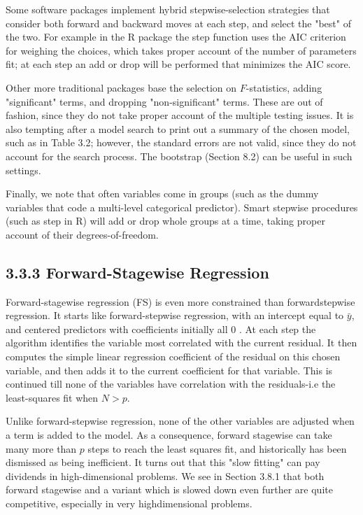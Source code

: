 \documentclass[10pt]{article}
\begin{document}
Some software packages implement hybrid stepwise-selection strategies that consider both forward and backward moves at each step, and select the "best" of the two. For example in the R package the step function uses the AIC criterion for weighing the choices, which takes proper account of the number of parameters fit; at each step an add or drop will be performed that minimizes the AIC score.

Other more traditional packages base the selection on $F$-statistics, adding "significant" terms, and dropping "non-significant" terms. These are out of fashion, since they do not take proper account of the multiple testing issues. It is also tempting after a model search to print out a summary of the chosen model, such as in Table 3.2; however, the standard errors are not valid, since they do not account for the search process. The bootstrap (Section 8.2) can be useful in such settings.

Finally, we note that often variables come in groups (such as the dummy variables that code a multi-level categorical predictor). Smart stepwise procedures (such as step in R) will add or drop whole groups at a time, taking proper account of their degrees-of-freedom.

\subsection*{3.3.3 Forward-Stagewise Regression}
Forward-stagewise regression (FS) is even more constrained than forwardstepwise regression. It starts like forward-stepwise regression, with an intercept equal to $\bar{y}$, and centered predictors with coefficients initially all 0 . At each step the algorithm identifies the variable most correlated with the current residual. It then computes the simple linear regression coefficient of the residual on this chosen variable, and then adds it to the current coefficient for that variable. This is continued till none of the variables have correlation with the residuals-i.e the least-squares fit when $N>p$.

Unlike forward-stepwise regression, none of the other variables are adjusted when a term is added to the model. As a consequence, forward stagewise can take many more than $p$ steps to reach the least squares fit, and historically has been dismissed as being inefficient. It turns out that this "slow fitting" can pay dividends in high-dimensional problems. We see in Section 3.8.1 that both forward stagewise and a variant which is slowed down even further are quite competitive, especially in very highdimensional problems.
\end{document}
